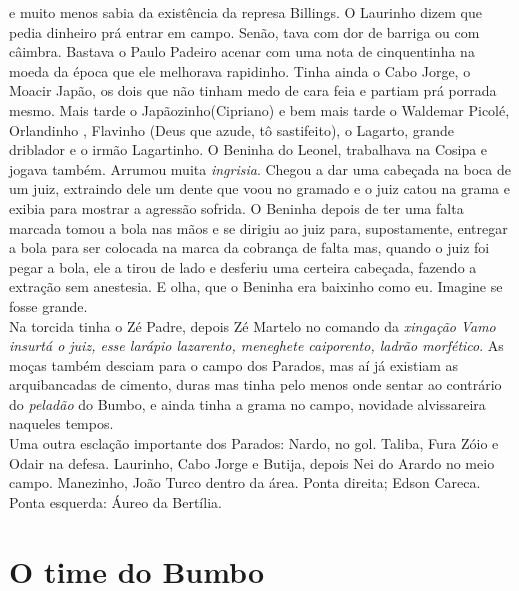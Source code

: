 \documentclass[12pt,brazil,]{book}
\begin{document}
e muito menos sabia da existência da represa Billings. O Laurinho dizem
que pedia dinheiro prá entrar em campo. Senão, tava com dor de barriga
ou com câimbra. Bastava o Paulo Padeiro acenar com uma nota de
cinquentinha na moeda da época que ele melhorava rapidinho. Tinha ainda
o Cabo Jorge, o Moacir Japão, os dois que não tinham medo de cara feia e
partiam prá porrada mesmo. Mais tarde o Japãozinho(Cipriano) e bem mais
tarde o Waldemar Picolé, Orlandinho , Flavinho (Deus que azude, tô
sastifeito), o Lagarto, grande driblador e o irmão Lagartinho. O Beninha
do Leonel, trabalhava na Cosipa e jogava também. Arrumou muita
\emph{ingrisia}. Chegou a dar uma cabeçada na boca de um juiz, extraindo
dele um dente que voou no gramado e o juiz catou na grama e exibia para
mostrar a agressão sofrida. O Beninha depois de ter uma falta marcada
tomou a bola nas mãos e se dirigiu ao juiz para, supostamente, entregar
a bola para ser colocada na marca da cobrança de falta mas, quando o
juiz foi pegar a bola, ele a tirou de lado e desferiu uma certeira
cabeçada, fazendo a extração sem anestesia. E olha, que o Beninha era
baixinho como eu. Imagine se fosse grande.\\
Na torcida tinha o Zé Padre, depois Zé Martelo no comando da
\emph{xingação} \emph{Vamo insurtá o juiz, esse larápio lazarento,
meneghete caiporento, ladrão morfético}. As moças também desciam para o
campo dos Parados, mas aí já existiam as arquibancadas de cimento, duras
mas tinha pelo menos onde sentar ao contrário do \emph{peladão} do
Bumbo, e ainda tinha a grama no campo, novidade alvissareira naqueles
tempos.\\
Uma outra esclação importante dos Parados: Nardo, no gol. Taliba, Fura
Zóio e Odair na defesa. Laurinho, Cabo Jorge e Butija, depois Nei do
Arardo no meio campo. Manezinho, João Turco dentro da área. Ponta
direita; Edson Careca. Ponta esquerda: Áureo da Bertília.

\section{O time do Bumbo}\label{o-time-do-bumbo}
\end{document}
